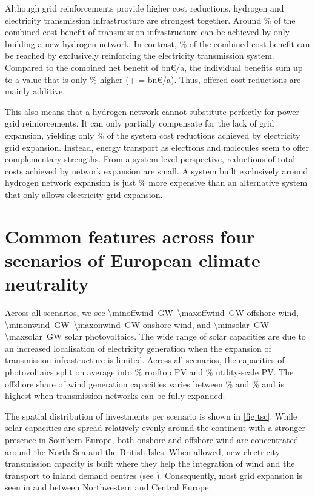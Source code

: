 Although grid reinforcements provide higher cost reductions, hydrogen and
electricity transmission infrastructure are strongest together. Around
\hyoftotalbenefit\% of the combined cost benefit of transmission infrastructure
can be achieved by only building a new hydrogen network. In contrast,
\acoftotalbenefit\% of the combined cost benefit can be reached by exclusively
reinforcing the electricity transmission system. Compared to the combined net
benefit of \gridbenefitabs bn\euro/a, the individual benefits sum up to a value
that is only \additivebenefitrel\% higher (\maxacbenefitabs + \maxhybenefitabs =
\additivebenefitabs bn\euro/a). Thus, offered cost reductions are mainly
additive.

This also means that a hydrogen network cannot substitute perfectly for power
grid reinforcements. It can only partially compensate for the lack of grid
expansion, yielding only \benefithyofac\% of the system cost reductions achieved
by electricity grid expansion. Instead, energy transport as electrons and
molecules seem to offer complementary strengths. From a system-level
perspective, reductions of total costs achieved by network expansion are small.
A system built exclusively around hydrogen network expansion is just \acvshycost\%
more expensive than an alternative system that only allows electricity grid
expansion.

\section*{Common features across four scenarios of European climate neutrality}
\label{sec:es}

Across all scenarios, we see \SIrange{\minoffwind}{\maxoffwind}{\giga\watt}
offshore wind, \SIrange{\minonwind}{\maxonwind}{\giga\watt} onshore wind, and
\SIrange{\minsolar}{\maxsolar}{\giga\watt} solar photovoltaics. The wide range
of solar capacities are due to an increased localisation of electricity
generation when the expansion of transmission infrastructure is limited. Across
all scenarios, the capacities of photovoltaics split on average into
\meanrooftopshare\% rooftop PV and \meanutilityshare\% utility-scale PV. The
offshore share of wind generation capacities varies between \minoffshoreshare\%
and \maxoffshoreshare\% and is highest when transmission networks can be fully
expanded.

The spatial distribution of investments per scenario is shown in \cref{fig:tsc}.
While solar capacities are spread relatively evenly around the continent with a
stronger presence in Southern Europe, both onshore and offshore wind are
concentrated around the North Sea and the British Isles. When allowed, new
electricity transmission capacity is built where they help the integration of
wind and the transport to inland demand centres (see ).
Consequently, most grid expansion is seen in and between Northwestern and
Central Europe.

